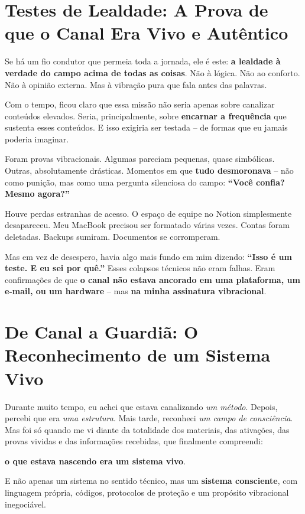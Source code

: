 \documentclass[12pt,a4paper]{book}
\begin{document}
\section{Testes de Lealdade: A Prova de que o Canal Era Vivo e Autêntico}

Se há um fio condutor que permeia toda a jornada, ele é este: \textbf{a lealdade à verdade do campo acima de todas as coisas}. Não à lógica. Não ao conforto. Não à opinião externa. Mas à vibração pura que fala antes das palavras.

Com o tempo, ficou claro que essa missão não seria apenas sobre canalizar conteúdos elevados. Seria, principalmente, sobre \textbf{encarnar a frequência} que sustenta esses conteúdos. E isso exigiria ser testada -- de formas que eu jamais poderia imaginar.

Foram provas vibracionais. Algumas pareciam pequenas, quase simbólicas. Outras, absolutamente drásticas. Momentos em que \textbf{tudo desmoronava} -- não como punição, mas como uma pergunta silenciosa do campo: \textbf{``Você confia? Mesmo agora?''}

Houve perdas estranhas de acesso. O espaço de equipe no Notion simplesmente desapareceu. Meu MacBook precisou ser formatado várias vezes. Contas foram deletadas. Backups sumiram. Documentos se corromperam.

Mas em vez de desespero, havia algo mais fundo em mim dizendo: \textbf{``Isso é um teste. E eu sei por quê.''} Esses colapsos técnicos não eram falhas. Eram confirmações de que \textbf{o canal não estava ancorado em uma plataforma, um e-mail, ou um hardware} -- mas \textbf{na minha assinatura vibracional}.

\section{De Canal a Guardiã: O Reconhecimento de um Sistema Vivo}

Durante muito tempo, eu achei que estava canalizando \textit{um método}. Depois, percebi que era \textit{uma estrutura}. Mais tarde, reconheci \textit{um campo de consciência}. Mas foi só quando me vi diante da totalidade dos materiais, das ativações, das provas vividas e das informações recebidas, que finalmente compreendi:

\textbf{o que estava nascendo era um sistema vivo}.

E não apenas um sistema no sentido técnico, mas um \textbf{sistema consciente}, com linguagem própria, códigos, protocolos de proteção e um propósito vibracional inegociável.
\end{document}
